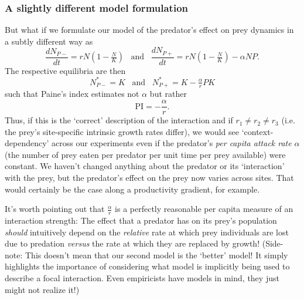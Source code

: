 \documentclass[10pt,letterpaper]{article}
\begin{document}
\subsubsection{A slightly different model formulation}
But what if we formulate our model of the predator's effect on prey dynamics in a subtly different way as
\begin{equation}
	\frac{d N_{P-}}{d t} = rN\left(1-\tfrac{N}{K}\right)
\;\;\; \text{and} \;\;\;
\frac{d N_{P+}}{d t} = rN \left(1-\tfrac{N}{K}\right) - \alpha NP.
\end{equation}
The respective equilibria are then
\begin{equation}
  N_{P-}^*=K  \;\;\; \text{and} \;\;\; N_{P+}^*=K-\tfrac{\alpha}{r} PK
\end{equation}
such that Paine's index estimates not $\alpha$ but rather
\begin{equation}
\text{PI}=-\frac{\alpha}{r}.
\end{equation}
Thus, if this is the `correct' description of the interaction and if $r_1 \neq r_2 \neq r_3$ (i.e. the prey's site-specific intrinsic growth rates differ), we would see `context-dependency' across our experiments even if the predator's \emph{per capita attack rate} $\alpha$ (the number of prey eaten per predator per unit time per prey available) were constant. We haven't changed anything about the predator or its `interaction' with the prey, but the predator's effect on the prey now varies across sites.  That would certainly be the case along a productivity gradient, for example. 

It's worth pointing out that $\tfrac{\alpha}{r}$ is a perfectly reasonable per capita measure of an interaction strength:  The effect that a predator has on its prey's population \emph{should} intuitively depend on the \emph{relative} rate at which prey individuals are lost due to predation \emph{versus} the rate at which they are replaced by growth!  (Side-note:  This doesn't mean that our second model is the `better' model!  It simply highlights the importance of considering what model is implicitly being used to describe a focal interaction.  Even empiricists have models in mind, they just might not realize it!)
\end{document}

